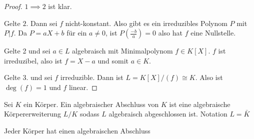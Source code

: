 \begin{proof}

\(1\implies 2\) ist klar.

Gelte \(2\). Dann sei \(f\) nicht-konstant. Also gibt es ein irreduzibles Polynom \(P\) mit \(P|f\). Da \(P=aX+b\) für ein \(a\neq 0\), ist \(P(\frac{-b}{a})=0\) also hat \(f\) eine Nullstelle.

Gelte 2 und sei \(a\in L\) algebraisch mit Minimalpolynom \(f\in K[X]\). \(f\) ist irreduzibel, also ist \(f=X-a\) und somit \(a\in K\).

Gelte 3. und sei \(f\) irreduzible. Dann ist \(L=K[X]/(f)\cong K\). Also ist \(\deg(f)=1\) und \(f\) linear.

\end{proof}

\begin{Def}
    Sei \(K\) ein Körper. Ein algebraischer Abschluss von \(K\) ist eine algebraische Körpererweiterung \(L/K\) sodass \(L\) algebraisch abgeschlossen ist. Notation \(L=\bar K\)
\end{Def}
\begin{Satz}
    Jeder Körper hat einen algebraischen Abschluss
\end{Satz}
